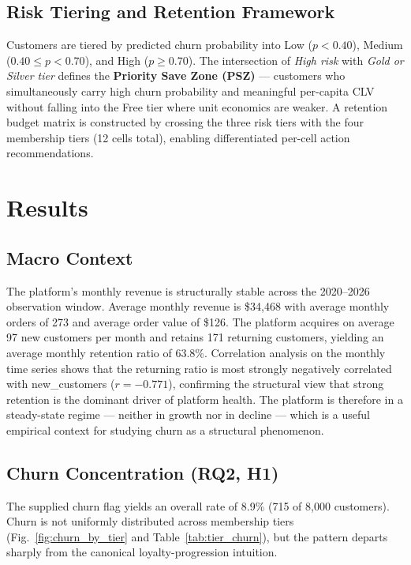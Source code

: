 \documentclass[conference]{IEEEtran}
\begin{document}
\subsection{Risk Tiering and Retention Framework}

Customers are tiered by predicted churn probability into Low ($p < 0.40$), Medium ($0.40 \leq p < 0.70$), and High ($p \geq 0.70$). The intersection of \emph{High risk} with \emph{Gold or Silver tier} defines the \textbf{Priority Save Zone (PSZ)} — customers who simultaneously carry high churn probability and meaningful per-capita CLV without falling into the Free tier where unit economics are weaker. A retention budget matrix is constructed by crossing the three risk tiers with the four membership tiers (12 cells total), enabling differentiated per-cell action recommendations.

\section{Results}

\subsection{Macro Context}

The platform's monthly revenue is structurally stable across the 2020--2026 observation window. Average monthly revenue is \$34{,}468 with average monthly orders of 273 and average order value of \$126. The platform acquires on average 97 new customers per month and retains 171 returning customers, yielding an average monthly retention ratio of 63.8\%. Correlation analysis on the monthly time series shows that the returning ratio is most strongly negatively correlated with new\_customers ($r = -0.771$), confirming the structural view that strong retention is the dominant driver of platform health. The platform is therefore in a steady-state regime — neither in growth nor in decline — which is a useful empirical context for studying churn as a structural phenomenon.

\subsection{Churn Concentration (RQ2, H1)}

The supplied churn flag yields an overall rate of 8.9\% (715 of 8{,}000 customers). Churn is not uniformly distributed across membership tiers (Fig.~\ref{fig:churn_by_tier} and Table~\ref{tab:tier_churn}), but the pattern departs sharply from the canonical loyalty-progression intuition.
\end{document}
